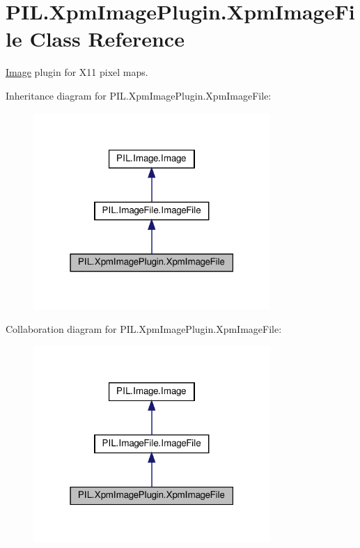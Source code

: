 \hypertarget{classPIL_1_1XpmImagePlugin_1_1XpmImageFile}{}\section{P\+I\+L.\+Xpm\+Image\+Plugin.\+Xpm\+Image\+File Class Reference}
\label{classPIL_1_1XpmImagePlugin_1_1XpmImageFile}


\hyperlink{namespacePIL_1_1Image}{Image} plugin for X11 pixel maps.  




Inheritance diagram for P\+I\+L.\+Xpm\+Image\+Plugin.\+Xpm\+Image\+File\+:
\nopagebreak
\begin{figure}[H]
\begin{center}
\leavevmode
\includegraphics[width=255pt]{classPIL_1_1XpmImagePlugin_1_1XpmImageFile__inherit__graph}
\end{center}
\end{figure}


Collaboration diagram for P\+I\+L.\+Xpm\+Image\+Plugin.\+Xpm\+Image\+File\+:
\nopagebreak
\begin{figure}[H]
\begin{center}
\leavevmode
\includegraphics[width=255pt]{classPIL_1_1XpmImagePlugin_1_1XpmImageFile__coll__graph}
\end{center}
\end{figure}

